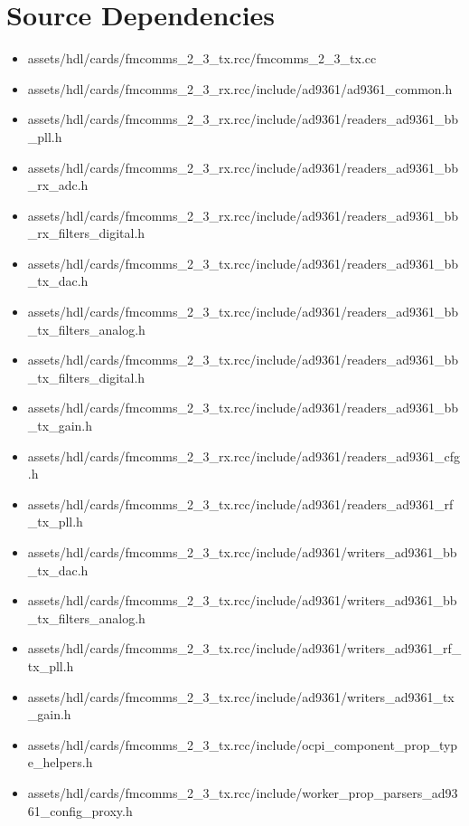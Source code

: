 \newpage

\section*{Source Dependencies}
\begin{itemize}
	\item assets/hdl/cards/fmcomms\_2\_3\_tx.rcc/fmcomms\_2\_3\_tx.cc
	\item assets/hdl/cards/fmcomms\_2\_3\_rx.rcc/include/ad9361/ad9361\_common.h
	\item assets/hdl/cards/fmcomms\_2\_3\_rx.rcc/include/ad9361/readers\_ad9361\_bb\_pll.h
	\item assets/hdl/cards/fmcomms\_2\_3\_rx.rcc/include/ad9361/readers\_ad9361\_bb\_rx\_adc.h
	\item assets/hdl/cards/fmcomms\_2\_3\_rx.rcc/include/ad9361/readers\_ad9361\_bb\_rx\_filters\_digital.h
	\item assets/hdl/cards/fmcomms\_2\_3\_tx.rcc/include/ad9361/readers\_ad9361\_bb\_tx\_dac.h
	\item assets/hdl/cards/fmcomms\_2\_3\_tx.rcc/include/ad9361/readers\_ad9361\_bb\_tx\_filters\_analog.h
	\item assets/hdl/cards/fmcomms\_2\_3\_tx.rcc/include/ad9361/readers\_ad9361\_bb\_tx\_filters\_digital.h
	\item assets/hdl/cards/fmcomms\_2\_3\_tx.rcc/include/ad9361/readers\_ad9361\_bb\_tx\_gain.h
	\item assets/hdl/cards/fmcomms\_2\_3\_rx.rcc/include/ad9361/readers\_ad9361\_cfg.h
	\item assets/hdl/cards/fmcomms\_2\_3\_tx.rcc/include/ad9361/readers\_ad9361\_rf\_tx\_pll.h
	\item assets/hdl/cards/fmcomms\_2\_3\_tx.rcc/include/ad9361/writers\_ad9361\_bb\_tx\_dac.h
	\item assets/hdl/cards/fmcomms\_2\_3\_tx.rcc/include/ad9361/writers\_ad9361\_bb\_tx\_filters\_analog.h
	\item assets/hdl/cards/fmcomms\_2\_3\_tx.rcc/include/ad9361/writers\_ad9361\_rf\_tx\_pll.h
	\item assets/hdl/cards/fmcomms\_2\_3\_tx.rcc/include/ad9361/writers\_ad9361\_tx\_gain.h
	\item assets/hdl/cards/fmcomms\_2\_3\_tx.rcc/include/ocpi\_component\_prop\_type\_helpers.h
	\item assets/hdl/cards/fmcomms\_2\_3\_tx.rcc/include/worker\_prop\_parsers\_ad9361\_config\_proxy.h
\end{itemize}

